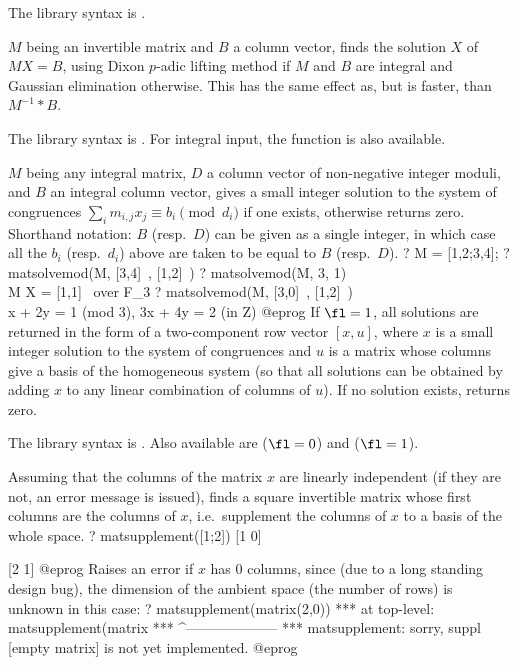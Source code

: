 The library syntax is .

\label{se:matsolve}
$M$ being an invertible matrix and $B$ a column
vector, finds the solution $X$ of $MX=B$, using Dixon $p$-adic lifting method
if $M$ and $B$ are integral and Gaussian elimination otherwise. This
has the same effect as, but is faster, than $M^{-1}*B$.

The library syntax is .
For integral input, the function
 is also available.

\label{se:matsolvemod}
$M$ being any integral matrix,
$D$ a column vector of non-negative integer moduli, and $B$ an integral
column vector, gives a small integer solution to the system of congruences
$\sum_i m_{i,j}x_j\equiv b_i\pmod{d_i}$ if one exists, otherwise returns
zero. Shorthand notation: $B$ (resp.~$D$) can be given as a single integer,
in which case all the $b_i$ (resp.~$d_i$) above are taken to be equal to $B$
(resp.~$D$).
\bprog
? M = [1,2;3,4];
? matsolvemod(M, [3,4]~, [1,2]~)
? matsolvemod(M, 3, 1) \\ M X = [1,1]~ over F_3
? matsolvemod(M, [3,0]~, [1,2]~) \\ x + 2y = 1 (mod 3), 3x + 4y = 2 (in Z)
@eprog
If $\fl=1$, all solutions are returned in the form of a two-component row
vector $[x,u]$, where $x$ is a small integer solution to the system of
congruences and $u$ is a matrix whose columns give a basis of the homogeneous
system (so that all solutions can be obtained by adding $x$ to any linear
combination of columns of $u$). If no solution exists, returns zero.

The library syntax is .
Also available are 
($\fl=0$) and  ($\fl=1$).

\label{se:matsupplement}
Assuming that the columns of the matrix $x$
are linearly independent (if they are not, an error message is issued), finds
a square invertible matrix whose first columns are the columns of $x$,
i.e.~supplement the columns of $x$ to a basis of the whole space.
\bprog
? matsupplement([1;2])
[1 0]

[2 1]
@eprog
Raises an error if $x$ has 0 columns, since (due to a long standing design
bug), the dimension of the ambient space (the number of rows) is unknown in
this case:
\bprog
? matsupplement(matrix(2,0))
  ***   at top-level: matsupplement(matrix
  ***                 ^--------------------
  *** matsupplement: sorry, suppl [empty matrix] is not yet implemented.
@eprog


